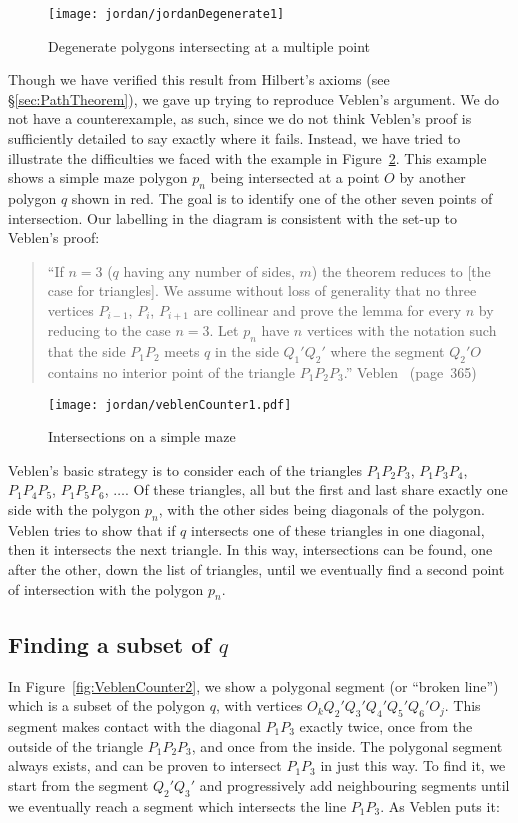 \begin{figure}
\centering
\texttt{[image: jordan/jordanDegenerate1]}
\caption{Degenerate polygons intersecting at a multiple point}
\label{fig:jordanDegenerate1}
\end{figure}

Though we have verified this result from Hilbert's axioms (see \S\ref{sec:PathTheorem}), we gave up trying to reproduce Veblen's argument. We do not have a counterexample, as such, since we do not think Veblen's proof is sufficiently detailed to say exactly where it fails. Instead, we have tried to illustrate the difficulties we faced with the example in Figure~\ref{fig:VeblenCounter1}. This example shows a simple maze polygon $p_n$ being intersected at a point $O$ by another polygon $q$ shown in red. The goal is to identify one of the other seven points of intersection. Our labelling in the diagram is consistent with the set-up to Veblen's proof:

\begin{quote}
``If $n=3$ ($q$ having any number of sides, $m$) the theorem reduces to [the case for triangles]. We assume without loss of generality that no three vertices $P_{i-1}$, $P_i$, $P_{i+1}$ are collinear and prove the lemma for every $n$ by reducing to the case $n=3$. Let $p_n$ have $n$ vertices with the notation such that the side $P_1P_2$ meets $q$ in the side $Q_1'Q_2'$ where the segment $Q_2'O$ contains no interior point of the triangle $P_1P_2P_3$.'' Veblen~\cite{Veblenphd} (page~365)
\end{quote}

\begin{figure}
\centering
\texttt{[image: jordan/veblenCounter1.pdf]}
\caption{Intersections on a simple maze}
\label{fig:VeblenCounter1}
\end{figure}

Veblen's basic strategy is to consider each of the triangles $P_1P_2P_3$, $P_1P_3P_4$, $P_1P_4P_5$, $P_1P_5P_6$, $\ldots$. Of these triangles, all but the first and last share exactly one side with the polygon $p_n$, with the other sides being diagonals of the polygon. Veblen tries to show that if $q$ intersects one of these triangles in one diagonal, then it intersects the next triangle. In this way, intersections can be found, one after the other, down the list of triangles, until we eventually find a second point of intersection with the polygon $p_n$.

\subsection{Finding a subset of $q$}\label{sec:SubsetOfQ}
In Figure~\ref{fig:VeblenCounter2}, we show a polygonal segment  (or ``broken line'') which is a subset of the polygon $q$, with vertices $O_kQ_2'Q_3'Q_4'Q_5'Q_6'O_j$. This segment makes contact with the diagonal $P_1P_3$ exactly twice, once from the outside of the triangle $P_1P_2P_3$, and once from the inside. The polygonal segment always exists, and can be proven to intersect $P_1P_3$ in just this way. To find it, we start from the segment $Q_2'Q_3'$ and progressively add neighbouring segments until we eventually reach a segment which intersects the line $P_1P_3$. As Veblen puts it:

